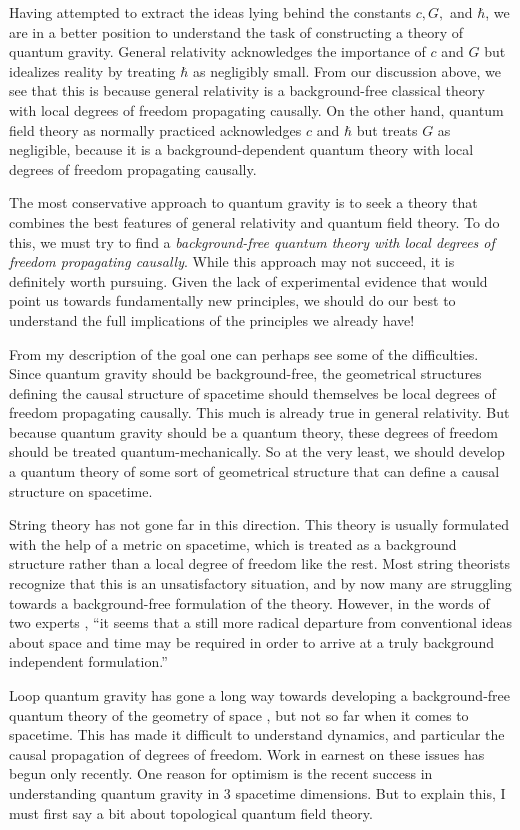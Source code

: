 Having attempted to extract the ideas lying behind the constants $c,G,$
and $\hbar$, we are in a better position to understand the task of
constructing a theory of quantum gravity.  General relativity
acknowledges the importance of $c$ and $G$ but idealizes reality by
treating $\hbar$ as negligibly small.  From our discussion above, we see
that this is because general relativity is a background-free
classical theory with local degrees of freedom propagating causally.
On the other hand, quantum field theory as normally practiced
acknowledges $c$ and $\hbar$ but treats $G$ as negligible, because it is
a background-dependent quantum theory with local degrees of freedom
propagating causally.

The most conservative approach to quantum gravity is to seek a theory
that combines the best features of general relativity and quantum field
theory.    To do this, we must try to find a {\it background-free
quantum theory with local degrees of freedom propagating causally}.  
While this approach may not succeed, it is definitely worth pursuing.
Given the lack of experimental evidence that would point us towards 
fundamentally new principles, we should do our best to understand
the full implications of the principles we already have!

From my description of the goal one can perhaps see some of the
difficulties.  Since quantum gravity should be background-free, the
geometrical structures defining the causal structure of spacetime should
themselves be local degrees of freedom propagating causally.  This much
is already true in general relativity.  But because quantum gravity
should be a quantum theory, these degrees of freedom should be treated
quantum-mechanically.  So at the very least, we should develop a quantum
theory of some sort of geometrical structure that can define a causal
structure on spacetime.   

String theory has not gone far in this direction.  This  theory is
usually formulated with the help of a metric on spacetime, which is
treated as a background structure rather than a local degree of freedom
like the rest.   Most string theorists recognize that this is an
unsatisfactory situation, and by now many are struggling towards a
background-free formulation of the theory.   However, in the words of
two experts \cite{HN}, ``it seems that a still more radical departure
from conventional ideas about space and time may be required in order to
arrive at a truly background independent formulation.''

Loop quantum gravity has gone a long way towards developing a
background-free quantum theory of the geometry of space
\cite{Ashtekar,Rovelli4}, but not so far when it comes to spacetime. 
This has made it difficult to understand dynamics, and particular the
causal propagation of degrees of freedom.  Work in earnest on these
issues has begun only recently.  One reason for optimism is the recent
success in understanding quantum gravity in 3 spacetime dimensions.  
But to explain this, I must first say a bit about topological quantum
field theory.  

